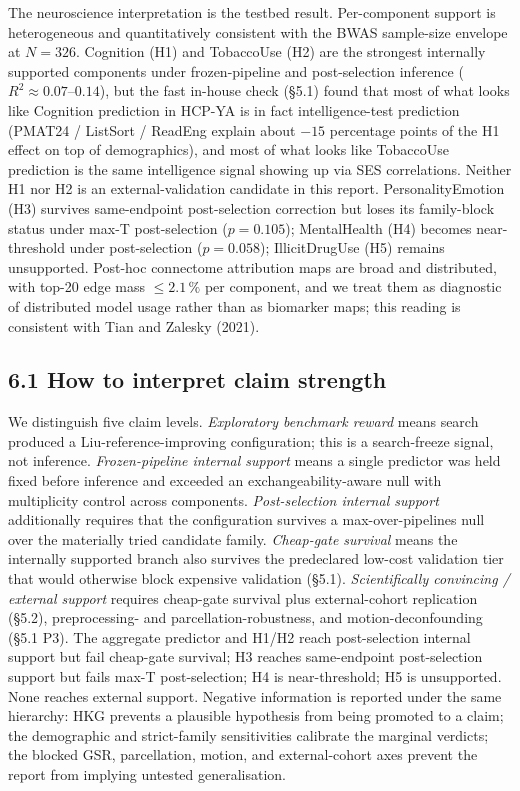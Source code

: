 \documentclass[11pt,letterpaper]{report}
\begin{document}
The neuroscience interpretation is the testbed result. Per-component support is heterogeneous and quantitatively consistent with the BWAS sample-size envelope at $N = 326$. Cognition (H1) and TobaccoUse (H2) are the strongest internally supported components under frozen-pipeline and post-selection inference ($R^{2} \approx 0.07$--$0.14$), but the fast in-house check (\S5.1) found that most of what looks like Cognition prediction in HCP-YA is in fact intelligence-test prediction (PMAT24 / ListSort / ReadEng explain about $-15$ percentage points of the H1 effect on top of demographics), and most of what looks like TobaccoUse prediction is the same intelligence signal showing up via SES correlations. Neither H1 nor H2 is an external-validation candidate in this report. PersonalityEmotion (H3) survives same-endpoint post-selection correction but loses its family-block status under max-T post-selection ($p = 0.105$); MentalHealth (H4) becomes near-threshold under post-selection ($p = 0.058$); IllicitDrugUse (H5) remains unsupported. Post-hoc connectome attribution maps are broad and distributed, with top-20 edge mass $\le 2.1\,\%$ per component, and we treat them as diagnostic of distributed model usage rather than as biomarker maps; this reading is consistent with Tian and Zalesky (2021).

\subsection*{6.1 How to interpret claim strength}

We distinguish five claim levels. \emph{Exploratory benchmark reward} means search produced a Liu-reference-improving configuration; this is a search-freeze signal, not inference. \emph{Frozen-pipeline internal support} means a single predictor was held fixed before inference and exceeded an exchangeability-aware null with multiplicity control across components. \emph{Post-selection internal support} additionally requires that the configuration survives a max-over-pipelines null over the materially tried candidate family. \emph{Cheap-gate survival} means the internally supported branch also survives the predeclared low-cost validation tier that would otherwise block expensive validation (\S5.1). \emph{Scientifically convincing / external support} requires cheap-gate survival plus external-cohort replication (\S5.2), preprocessing- and parcellation-robustness, and motion-deconfounding (\S5.1 P3). The aggregate predictor and H1/H2 reach post-selection internal support but fail cheap-gate survival; H3 reaches same-endpoint post-selection support but fails max-T post-selection; H4 is near-threshold; H5 is unsupported. None reaches external support. Negative information is reported under the same hierarchy: HKG prevents a plausible hypothesis from being promoted to a claim; the demographic and strict-family sensitivities calibrate the marginal verdicts; the blocked GSR, parcellation, motion, and external-cohort axes prevent the report from implying untested generalisation.
\end{document}
